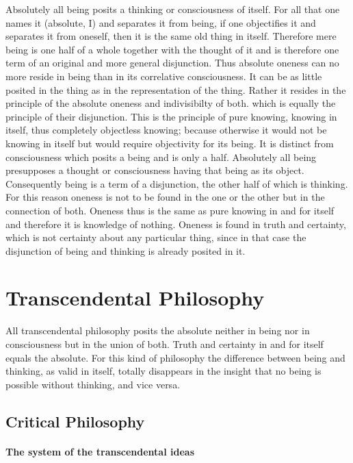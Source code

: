 \documentclass{article}
\begin{document}
Absolutely all being posits a thinking or consciousness of itself.
For all that one names it (absolute, I) and separates it from being,
if one objectifies it and separates it from oneself,
then it is the same old thing in itself.
Therefore mere being is one half of a whole
together with the thought of it
and is therefore one term of
an original and more general disjunction.
Thus absolute oneness can no more reside in being
than in its correlative consciousness.
It can be as little posited in the thing
as in the representation of the thing.
Rather it resides in the principle of
the absolute oneness and indivisibilty of both.
which is equally the principle of their disjunction.
This is the principle of pure knowing, knowing in itself,
thus completely objectless knowing;
because otherwise it would not be knowing in itself
but would require objectivity for its being.
It is distinct from consciousness
which posits a being and is only a half.
Absolutely all being presupposes a thought or consciousness
having that being as its object. 
Consequently being is a term of a disjunction,
the other half of which is thinking.
For this reason oneness is not to be found
in the one or the other
but in the connection of both.
Oneness thus is the same as pure knowing in and for itself
and therefore it is knowledge of nothing.
Oneness is found in truth and certainty,
which is not certainty about any particular thing,
since in that case the disjunction of being and thinking
is already posited in it.

\section{Transcendental Philosophy}
All transcendental philosophy posits the absolute
neither in being nor in consciousness but in the union of both.
Truth and certainty in and for itself equals the absolute.
For this kind of philosophy the difference between being and thinking,
as valid in itself, totally disappears in the insight that
no being is possible without thinking, and vice versa.

\subsection{Critical Philosophy}

\paragraph{The system of the transcendental ideas}
\end{document}
